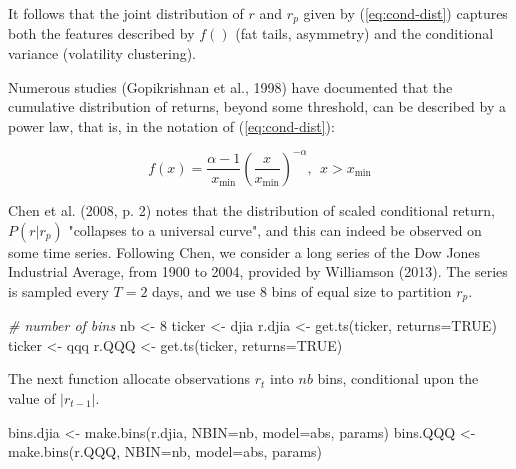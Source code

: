 \documentclass[
  11pt,
]{article}
\newenvironment{Shaded}{\begin{snugshade}}{\end{snugshade}}
\newcommand{\AttributeTok}[1]{\textcolor[rgb]{0.77,0.63,0.00}{#1}}
\newcommand{\CommentTok}[1]{\textcolor[rgb]{0.56,0.35,0.01}{\textit{#1}}}
\newcommand{\ConstantTok}[1]{\textcolor[rgb]{0.00,0.00,0.00}{#1}}
\newcommand{\DecValTok}[1]{\textcolor[rgb]{0.00,0.00,0.81}{#1}}
\newcommand{\FunctionTok}[1]{\textcolor[rgb]{0.00,0.00,0.00}{#1}}
\newcommand{\NormalTok}[1]{#1}
\newcommand{\OtherTok}[1]{\textcolor[rgb]{0.56,0.35,0.01}{#1}}
\newcommand{\StringTok}[1]{\textcolor[rgb]{0.31,0.60,0.02}{#1}}
\begin{document}
It follows that the joint distribution of \(r\) and \(r_p\) given by
(\ref{eq:cond-dist}) captures both the features described by \(f()\)
(fat tails, asymmetry) and the conditional variance (volatility
clustering).

Numerous studies (Gopikrishnan et al., 1998) have documented that the
cumulative distribution of returns, beyond some threshold, can be
described by a power law, that is, in the notation of
(\ref{eq:cond-dist}):

\begin{equation}
f \left( x \right) = \frac{\alpha-1}{x_{\mbox{min}}} \left( \frac{x}{x_{\mbox{min}}} \right)^{-\alpha}, \ \ x>x_{\mbox{min}}
\label{eq:power-law}
\end{equation}

Chen et al. (2008, p. 2) notes that the distribution of scaled
conditional return, \(P(r | r_p)\) "collapses to a universal curve", and
this can indeed be observed on some time series. Following Chen, we
consider a long series of the Dow Jones Industrial Average, from 1900 to
2004, provided by Williamson (2013). The series is sampled every \(T=2\)
days, and we use 8 bins of equal size to partition \(r_p\).

\begin{Shaded}
\begin{Highlighting}[]
\CommentTok{\# number of bins}
\NormalTok{nb }\OtherTok{\textless{}{-}} \DecValTok{8}
\NormalTok{ticker }\OtherTok{\textless{}{-}} \StringTok{\textquotesingle{}djia\textquotesingle{}}
\NormalTok{r.djia }\OtherTok{\textless{}{-}} \FunctionTok{get.ts}\NormalTok{(ticker, }\AttributeTok{returns=}\ConstantTok{TRUE}\NormalTok{)}
\NormalTok{ticker }\OtherTok{\textless{}{-}} \StringTok{\textquotesingle{}qqq\textquotesingle{}}
\NormalTok{r.QQQ }\OtherTok{\textless{}{-}} \FunctionTok{get.ts}\NormalTok{(ticker,  }\AttributeTok{returns=}\ConstantTok{TRUE}\NormalTok{)}
\end{Highlighting}
\end{Shaded}

The next function allocate observations \(r_t\) into \(nb\) bins,
conditional upon the value of \(|r_{t-1}|\).

\begin{Shaded}
\begin{Highlighting}[]
\NormalTok{bins.djia }\OtherTok{\textless{}{-}} \FunctionTok{make.bins}\NormalTok{(r.djia, }\AttributeTok{NBIN=}\NormalTok{nb, }\AttributeTok{model=}\StringTok{\textquotesingle{}abs\textquotesingle{}}\NormalTok{, params)}
\NormalTok{bins.QQQ }\OtherTok{\textless{}{-}} \FunctionTok{make.bins}\NormalTok{(r.QQQ, }\AttributeTok{NBIN=}\NormalTok{nb, }\AttributeTok{model=}\StringTok{\textquotesingle{}abs\textquotesingle{}}\NormalTok{, params)}
\end{Highlighting}
\end{Shaded}
\end{document}
